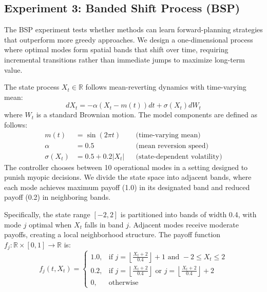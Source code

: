 \documentclass[11pt,reqno,a4paper]{amsart}
\theoremstyle{definition}
\numberwithin{equation}{section}
\DeclareMathOperator{\1}{\mathbbm{1}}
\begin{document}
\subsection{Experiment 3: Banded Shift Process (BSP)}\label{sec:numerical:stapel}

The BSP experiment tests whether methods can learn forward-planning strategies that outperform more greedy approaches. We design a one-dimensional process where optimal modes form spatial bands that shift over time, requiring incremental transitions rather than immediate jumps to maximize long-term value.

The state process $X_t \in \mathbb{R}$ follows mean-reverting dynamics with time-varying mean:
\begin{equation}
  dX_t = -\alpha(X_t - m(t))dt + \sigma(X_t)dW_t
\end{equation}
where $W_t$ is a standard Brownian motion. The model components are defined as follows:
\begin{align}
  m(t)      & = \sin(2\pi t)   &  & \text{(time-varying mean)}          \\
  \alpha      & = 0.5            &  & \text{(mean reversion speed)}       \\
  \sigma(X_t) & = 0.5 + 0.2|X_t| &  & \text{(state-dependent volatility)}
\end{align}
The controller chooses between 10 operational modes in a setting designed to punish myopic decisions. We divide the state space into adjacent bands, where each mode achieves maximum payoff (1.0) in its designated band and reduced payoff (0.2) in neighboring bands.

Specifically, the state range $[-2, 2]$ is partitioned into bands of width 0.4, with mode $j$ optimal when $X_t$ falls in band $j$. Adjacent modes receive moderate payoffs, creating a local neighborhood structure. The payoff function $f_j : \mathbb{R} \times [0,1] \to \mathbb{R}$ is:
\begin{equation}
  f_j(t,X_t) =
  \begin{cases}
    1.0, & \text{if } j = \left\lfloor\frac{X_t + 2}{0.4}\right\rfloor + 1 \text{ and } -2 \leq X_t \leq 2                              \\
    0.2, & \text{if } j = \left\lfloor\frac{X_t + 2}{0.4}\right\rfloor \text{ or } j = \left\lfloor\frac{X_t + 2}{0.4}\right\rfloor + 2 \\
    0,   & \text{otherwise}
  \end{cases}
\end{equation}
\end{document}
